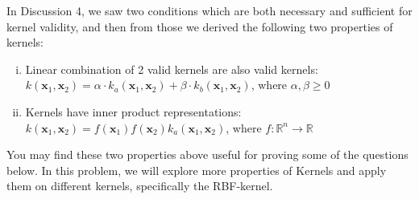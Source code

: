 \newcommand*{\inner}[2]{\langle #1,#2\rangle}


In Discussion 4, we saw two conditions which are both necessary and sufficient for kernel validity, and then from those we derived the following two properties of kernels:

\begin{enumerate}[i.]
  
\item Linear combination of 2 valid kernels are also valid kernels:\\
$ k(\textbf{x}_1, \textbf{x}_2) = \alpha \cdot k_a(\textbf{x}_1, \textbf{x}_2) + \beta \cdot k_b(\textbf{x}_1, \textbf{x}_2) $, where $\alpha, \beta \geq 0$
  
\item Kernels have inner product representations:\\
$ k(\textbf{x}_1, \textbf{x}_2) = f(\textbf{x}_1)f(\textbf{x}_2)k_a(\textbf{x}_1, \textbf{x}_2) $, where $ f : \mathbb{R}^{n} \rightarrow \mathbb{R} $

\end{enumerate}

You may find these two properties above useful for proving some of the questions below.
In this problem, we will explore more properties of Kernels and apply them on different kernels, specifically the RBF-kernel.

